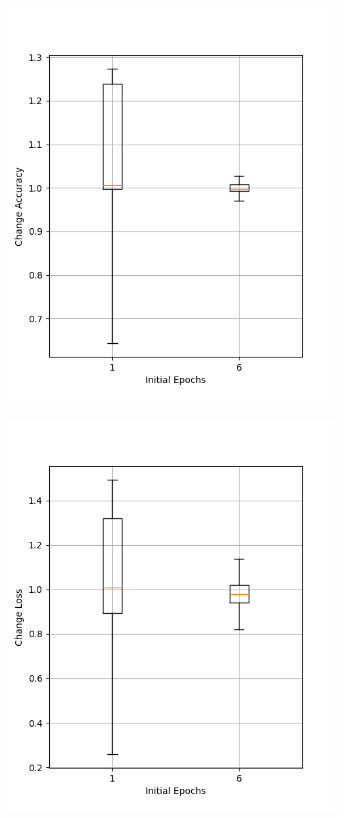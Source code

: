\begin{figure}
    \begin{subfigure}{0.5\textwidth}
        \centering
        \includegraphics[width=0.95\textwidth]{plots/InitEpoch_NotTrained_accuracy.png}
    \end{subfigure}
    \begin{subfigure}{0.5\textwidth}
        \centering
        \includegraphics[width=0.95\textwidth]{plots/InitEpoch_NotTrained_loss.png}

\end{subfigure}
\end{figure}
